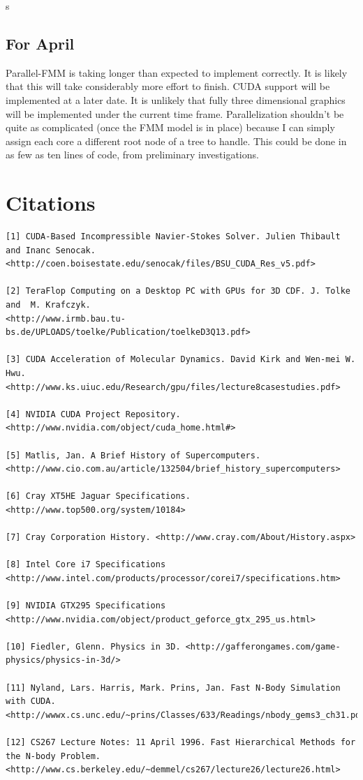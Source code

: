 s\documentclass[10pt]{article}
\begin{document}
\subsection{For April}
Parallel-FMM is taking longer than expected to implement correctly. It is likely that this will take considerably more effort to finish. CUDA support will be implemented at a later date. It is unlikely that fully three dimensional graphics will be implemented under the current time frame. Parallelization shouldn't be quite as complicated (once the FMM model is in place) because I can simply assign each core a different root node of a tree to handle. This could be done in as few as ten lines of code, from preliminary investigations. 

\section{Citations}


\begin{verbatim}
[1] CUDA-Based Incompressible Navier-Stokes Solver. Julien Thibault and Inanc Senocak.
<http://coen.boisestate.edu/senocak/files/BSU_CUDA_Res_v5.pdf>

[2] TeraFlop Computing on a Desktop PC with GPUs for 3D CDF. J. Tolke and  M. Krafczyk.  
<http://www.irmb.bau.tu-bs.de/UPLOADS/toelke/Publication/toelkeD3Q13.pdf>

[3] CUDA Acceleration of Molecular Dynamics. David Kirk and Wen-mei W. Hwu.  
<http://www.ks.uiuc.edu/Research/gpu/files/lecture8casestudies.pdf>

[4] NVIDIA CUDA Project Repository. <http://www.nvidia.com/object/cuda_home.html#>

[5] Matlis, Jan. A Brief History of Supercomputers. 
<http://www.cio.com.au/article/132504/brief_history_supercomputers>

[6] Cray XT5HE Jaguar Specifications. <http://www.top500.org/system/10184>

[7] Cray Corporation History. <http://www.cray.com/About/History.aspx>

[8] Intel Core i7 Specifications <http://www.intel.com/products/processor/corei7/specifications.htm>

[9] NVIDIA GTX295 Specifications <http://www.nvidia.com/object/product_geforce_gtx_295_us.html>

[10] Fiedler, Glenn. Physics in 3D. <http://gafferongames.com/game-physics/physics-in-3d/>

[11] Nyland, Lars. Harris, Mark. Prins, Jan. Fast N-Body Simulation with CUDA. 
<http://wwwx.cs.unc.edu/~prins/Classes/633/Readings/nbody_gems3_ch31.pdf>

[12] CS267 Lecture Notes: 11 April 1996. Fast Hierarchical Methods for the N-body Problem.
<http://www.cs.berkeley.edu/~demmel/cs267/lecture26/lecture26.html>
\end{verbatim}
\end{document}
